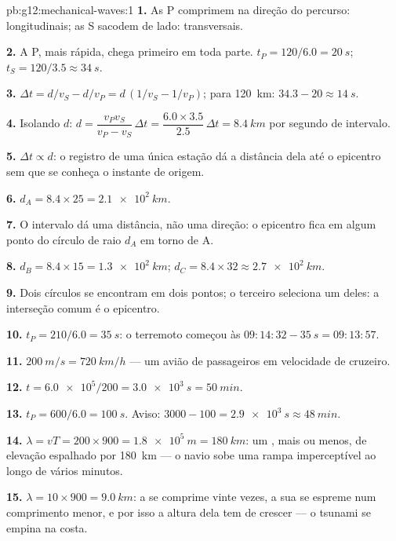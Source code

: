 \begin{solution}{pb:g12:mechanical-waves:1}
\textbf{1.} As P comprimem na direção do percurso: longitudinais; as S
sacodem de lado: transversais.

\textbf{2.} A P, mais rápida, chega primeiro em toda parte.
$t_P = 120/6.0 = \qty{20}{s}$; $t_S = 120/3.5 \approx \qty{34}{s}$.

\textbf{3.} $\Delta t = d/v_S - d/v_P = d\,(1/v_S - 1/v_P)$; para
\qty{120}{km}: $34.3 - 20 \approx \qty{14}{s}$.

\textbf{4.} Isolando $d$: $d = \dfrac{v_P v_S}{v_P - v_S}\,\Delta t
= \dfrac{6.0 \times 3.5}{2.5}\,\Delta t = \qty{8.4}{km}$ por segundo de
intervalo.

\textbf{5.} $\Delta t \propto d$: o registro de uma única estação dá a
distância dela até o epicentro sem que se conheça o instante de origem.

\textbf{6.} $d_A = 8.4 \times 25 = \qty{2.1e2}{km}$.

\textbf{7.} O intervalo dá uma distância, não uma direção: o epicentro
fica em algum ponto do círculo de raio $d_A$ em torno de A.

\textbf{8.} $d_B = 8.4 \times 15 = \qty{1.3e2}{km}$;
$d_C = 8.4 \times 32 \approx \qty{2.7e2}{km}$.

\textbf{9.} Dois círculos se encontram em dois pontos; o terceiro
seleciona um deles: a interseção comum é o epicentro.

\textbf{10.} $t_P = 210/6.0 = \qty{35}{s}$: o terremoto começou às
$09{:}14{:}32 - \qty{35}{s} = 09{:}13{:}57$.

\textbf{11.} $\qty{200}{m/s} = \qty{720}{km/h}$ --- um avião de passageiros
em velocidade de cruzeiro.

\textbf{12.} $t = \num{6.0e5}/200 = \qty{3.0e3}{s} = \qty{50}{min}$.

\textbf{13.} $t_P = 600/6.0 = \qty{100}{s}$. Aviso:
$3000 - 100 = \qty{2.9e3}{s} \approx \qty{48}{min}$.

\textbf{14.} $\lambda = vT = 200 \times 900 = \qty{1.8e5}{m} =
\qty{180}{km}$: um , mais ou menos, de elevação espalhado por
\qty{180}{km} --- o navio sobe uma rampa imperceptível ao longo de vários
minutos.

\textbf{15.} $\lambda = 10 \times 900 = \qty{9.0}{km}$: a  se
comprime vinte vezes, a sua  se espreme num comprimento menor, e
por isso a altura dela tem de crescer --- o tsunami se empina na costa.


\end{solution}
